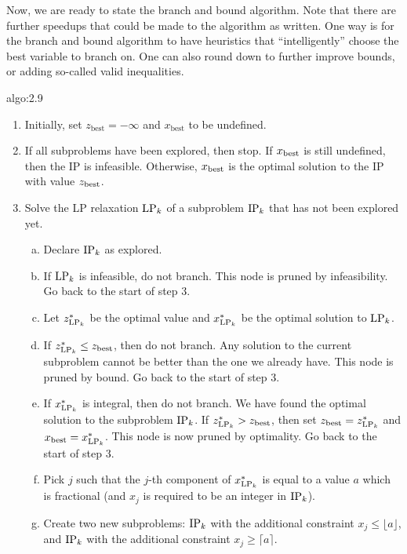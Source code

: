 Now, we are ready to state the branch and bound algorithm. Note that there 
are further speedups that could be made to the algorithm as written. One 
way is for the branch and bound algorithm to have heuristics that 
``intelligently'' choose the best variable to branch on. One can also 
round down to further improve bounds, or adding so-called valid inequalities. 

\begin{algo}{algo:2.9}
    \begin{enumerate}
        \item Initially, set $z_{\text{best}} = -\infty$ and $x_{\text{best}}$ 
        to be undefined. 
        \item If all subproblems have been explored, then stop. If 
        $x_{\rm best}$ is still undefined, then the IP is infeasible.
        Otherwise, $x_{\rm best}$ is the optimal solution to the IP with 
        value $z_{\rm best}$. 
        \item Solve the LP relaxation ${\rm LP}_k$ of a subproblem 
        ${\rm IP}_k$ that has not been explored yet. 
        \begin{enumerate}[(a)]
            \item Declare ${\rm IP}_k$ as explored. 
            \item If ${\rm LP}_k$ is infeasible, do not branch. This node is 
            pruned by infeasibility. Go back to the start of step 3. 
            \item Let $z_{{\rm LP}_k}^*$ be the optimal value and 
            $x_{{\rm LP}_k}^*$ be the optimal solution to ${\rm LP}_k$. 
            \item If $z_{{\rm LP}_k}^* \leq z_{\rm best}$, then do not 
            branch. Any solution to the current subproblem cannot be 
            better than the one we already have. This node is pruned by 
            bound. Go back to the start of step 3. 
            \item If $x_{{\rm LP}_k}^*$ is integral, then do not branch. 
            We have found the optimal solution to the subproblem ${\rm IP}_k$.
            If $z_{{\rm LP}_k}^* > z_{\rm best}$, then set 
            $z_{\rm best} = z_{{\rm LP}_k}^*$ and $x_{\rm best} = 
            x_{{\rm LP}_k}^*$. This node is now pruned by optimality. Go back 
            to the start of step 3. 
            \item Pick $j$ such that the $j$-th component of 
            $x_{{\rm LP}_k}^*$ is equal to a value $a$ which is fractional 
            (and $x_j$ is required to be an integer in ${\rm IP}_k$). 
            \item Create two new subproblems: ${\rm IP}_k$ with the 
            additional constraint $x_j \leq \lfloor a \rfloor$, and 
            ${\rm IP}_k$ with the additional constraint $x_j \geq 
            \lceil a \rceil$. 
        \end{enumerate}
    \end{enumerate}
\end{algo}

